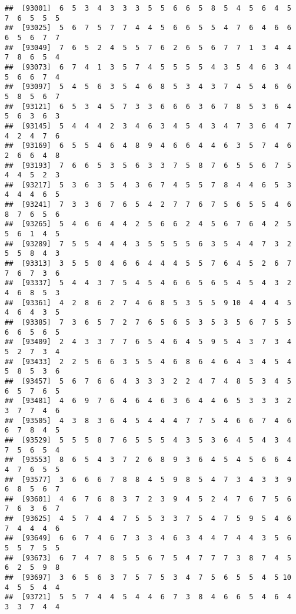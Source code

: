 \documentclass[
]{book}
\begin{document}
\begin{verbatim}
##  [93001]  6  5  3  4  3  3  3  5  5  6  6  5  8  5  4  5  6  4  5  7  6  5  5  5
##  [93025]  5  6  7  5  7  7  4  4  5  6  6  5  5  4  7  6  4  6  6  6  5  6  7  7
##  [93049]  7  6  5  2  4  5  5  7  6  2  6  5  6  7  7  1  3  4  4  7  8  6  5  4
##  [93073]  6  7  4  1  3  5  7  4  5  5  5  5  4  3  5  4  6  3  4  5  6  6  7  4
##  [93097]  5  4  5  6  3  5  4  6  8  5  3  4  3  7  4  5  4  6  6  5  8  5  6  7
##  [93121]  6  5  3  4  5  7  3  3  6  6  6  3  6  7  8  5  3  6  4  5  6  3  6  3
##  [93145]  5  4  4  4  2  3  4  6  3  4  5  4  3  4  7  3  6  4  7  4  2  4  7  6
##  [93169]  6  5  5  4  6  4  8  9  4  6  6  4  4  6  3  5  7  4  6  2  6  6  4  8
##  [93193]  7  6  6  5  3  5  6  3  3  7  5  8  7  6  5  5  6  7  5  4  4  5  2  3
##  [93217]  5  3  6  3  5  4  3  6  7  4  5  5  7  8  4  4  6  5  3  4  4  4  6  5
##  [93241]  7  3  3  6  7  6  5  4  2  7  7  6  7  5  6  5  5  4  6  8  7  6  5  6
##  [93265]  5  4  6  6  4  4  2  5  6  6  2  4  5  6  7  6  4  2  5  5  6  1  4  5
##  [93289]  7  5  5  4  4  4  3  5  5  5  5  6  3  5  4  4  7  3  2  5  5  8  4  3
##  [93313]  3  5  5  0  4  6  6  4  4  4  5  5  7  6  4  5  2  6  7  7  6  7  3  6
##  [93337]  5  4  4  3  7  5  4  5  4  6  6  5  6  5  4  5  4  3  2  4  6  8  5  3
##  [93361]  4  2  8  6  2  7  4  6  8  5  3  5  5  9 10  4  4  4  5  4  6  4  3  5
##  [93385]  7  3  6  5  7  2  7  6  5  6  5  3  5  3  5  6  7  5  5  6  6  5  6  5
##  [93409]  2  4  3  3  7  7  6  5  4  6  4  5  9  5  4  3  7  3  4  5  2  7  3  4
##  [93433]  2  2  5  6  6  3  5  5  4  6  8  6  4  6  4  3  4  5  4  5  8  5  3  6
##  [93457]  5  6  7  6  6  4  3  3  3  2  2  4  7  4  8  5  3  4  5  6  5  7  6  5
##  [93481]  4  6  9  7  6  4  6  4  6  3  6  4  4  6  5  3  3  3  2  3  7  7  4  6
##  [93505]  4  3  8  3  6  4  5  4  4  4  7  7  5  4  6  6  7  4  6  6  7  8  4  5
##  [93529]  5  5  5  8  7  6  5  5  5  4  3  5  3  6  4  5  4  3  4  7  5  6  5  4
##  [93553]  8  6  5  4  3  7  2  6  8  9  3  6  4  5  4  5  6  6  4  4  7  6  5  5
##  [93577]  3  6  6  6  7  8  8  4  5  9  8  5  4  7  3  4  3  3  9  6  8  5  6  7
##  [93601]  4  6  7  6  8  3  7  2  3  9  4  5  2  4  7  6  7  5  6  7  6  3  6  7
##  [93625]  4  5  7  4  4  7  5  5  3  3  7  5  4  7  5  9  5  4  6  7  4  4  4  6
##  [93649]  6  6  7  4  6  7  3  3  4  6  3  4  4  7  4  4  3  5  6  5  5  7  5  5
##  [93673]  6  7  4  7  8  5  5  6  7  5  4  7  7  7  3  8  7  4  5  6  2  5  9  8
##  [93697]  3  6  5  6  3  7  5  7  5  3  4  7  5  6  5  5  4  5 10  4  5  5  4  4
##  [93721]  5  5  7  4  4  5  4  4  6  7  3  8  4  6  6  5  4  6  4  3  3  7  4  4

\end{verbatim}
\end{document}
